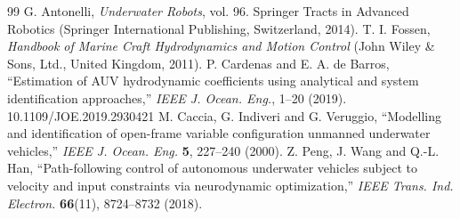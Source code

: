 \documentclass[DTMColor]{ROB-New}
\begin{document}
\begin{thebibliography}{99}
G. Antonelli, {\it Underwater Robots}, vol. 96. Springer Tracts in Advanced Robotics (Springer International Publishing, Switzerland, 2014).
T. I. Fossen, {\it Handbook of Marine Craft Hydrodynamics and Motion Control} (John Wiley \& Sons, Ltd., United Kingdom, 2011).
P. Cardenas and E. A. de Barros, ``Estimation of AUV hydrodynamic coefficients using analytical and system identification approaches,'' {\it IEEE J. Ocean. Eng.}, 1--20 (2019). 10.1109/JOE.2019.2930421
M. Caccia, G. Indiveri and G. Veruggio, ``Modelling and identification of open-frame variable configuration unmanned underwater vehicles,'' {\it IEEE J. Ocean. Eng.} \textbf{5}, 227--240 (2000).
Z. Peng, J. Wang and Q.-L. Han, ``Path-following control of autonomous underwater vehicles subject to velocity and input constraints via neurodynamic optimization,'' {\it IEEE Trans. Ind. Electron.} \textbf{66}(11), 8724--8732 (2018).
\end{thebibliography}
\end{document}
